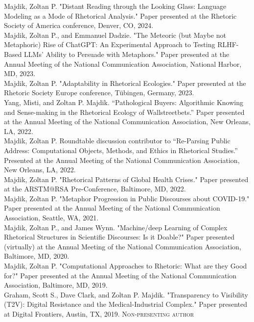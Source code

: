\documentclass[10pt, a4paper]{article}
\newcommand{\years}[1]{\marginnote{\scriptsize #1}}
\begin{document}
\years{2024}Majdik, Zoltan P. "Distant Reading through the Looking Glass: Language Modeling as a Mode of Rhetorical Analysis." Paper presented at the Rhetoric Society of America conference, Denver, CO, 2024.\\
\years{2023}Majdik, Zoltan P., and Emmanuel Dadzie. "The Meteoric (but Maybe not Metaphoric) Rise of ChatGPT: An Experimental Approach to Testing RLHF-Based LLMs' Ability to Persuade with Metaphors." Paper presented at the Annual Meeting of the National Communication Association, National Harbor, MD, 2023.\\
\years{2023}Majdik, Zoltan P. "Adaptability in Rhetorical Ecologies." Paper presented at the Rhetoric Society Europe conference, T{\"u}bingen, Germany, 2023.\\
\years{2022}Yang, Misti, and Zoltan P. Majdik. “Pathological Buyers: Algorithmic Knowing and Sense-making in the Rhetorical Ecology of Wallstreetbets.” Paper presented at the Annual Meeting of the National Communication Association, New Orleans, LA, 2022.\\
\years{2022}Majdik, Zoltan P. Roundtable discussion contributor to “Re-Parsing Public Address: Computational Objects, Methods, and Ethics in Rhetorical Studies.” Presented at the Annual Meeting of the National Communication Association, New Orleans, LA, 2022.\\
\years{2022}Majdik, Zoltan P. "Rhetorical Patterns of Global Health Crises." Paper presented at the ARSTM@RSA Pre-Conference, Baltimore, MD, 2022.\\
\years{2021}Majdik, Zoltan P. "Metaphor Progression in Public Discourses about COVID-19." Paper presented at the Annual Meeting of the National Communication Association, Seattle, WA, 2021.\\
\years{2020}Majdik, Zoltan P., and James Wynn. "Machine/deep Learning of Complex
Rhetorical Structures in Scientific Discourses: Is it Doable?" Paper presented
(virtually) at the Annual Meeting of the National Communication Association,
Baltimore, MD, 2020.\\
\years{2019}Majdik, Zoltan P. "Computational Approaches to Rhetoric: What are
they Good for?" Paper presented at the Annual Meeting of the National
Communication Association, Baltimore, MD, 2019.\\
\years{2019}Graham, Scott S., Dave Clark, and Zoltan P. Majdik. "Transparency
to Visibility (T2V): Digital Resistance and the Medical-Industrial Complex."
Paper presented at Digital Frontiers, Austin, TX, 2019. \textsc{Non-presenting
author}\\
\end{document}
